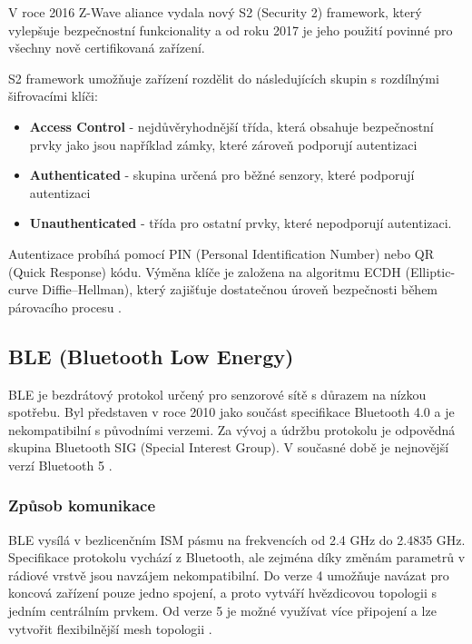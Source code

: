  V roce 2016 Z-Wave aliance vydala nový S2 (Security 2) framework, který vylepšuje bezpečnostní funkcionality 
 a od roku 2017 je jeho použití povinné pro všechny nově certifikovaná zařízení. 
 
 S2 framework umožňuje zařízení rozdělit do následujících skupin s rozdílnými šifrovacími klíči:
 \begin{itemize}
  \item \textbf{Access Control} - 
   nejdůvěryhodnější třída, která obsahuje bezpečnostní prvky jako jsou například zámky,
   které zároveň podporují autentizaci
  \item \textbf{Authenticated} - 
  skupina určená pro běžné senzory, které podporují autentizaci 
  \item \textbf{Unauthenticated} - 
  třída pro ostatní prvky, které nepodporují autentizaci.
 \end{itemize}
 Autentizace probíhá pomocí PIN (Personal Identification Number) nebo QR (Quick Response) kódu.
 Výměna klíče je založena na algoritmu ECDH (Elliptic-curve Diffie–Hellman), který zajišťuje 
 dostatečnou úroveň bezpečnosti během párovacího procesu \cite{cesnet-survey}.

 
  \subsection{BLE (Bluetooth Low Energy)} 
  BLE je bezdrátový protokol určený pro senzorové sítě s důrazem na nízkou spotřebu. Byl představen 
  v roce 2010 jako součást specifikace Bluetooth 4.0 a je nekompatibilní s původními verzemi. 
  Za vývoj a údržbu protokolu je odpovědná skupina Bluetooth SIG (Special Interest Group).
  V současné době je nejnovější verzí Bluetooth 5 \cite{cesnet-survey}.
  
  \subsubsection{Způsob komunikace}
  BLE vysílá v bezlicenčním ISM pásmu na frekvencích od 2.4 GHz do 2.4835 GHz. Specifikace
  protokolu vychází z Bluetooth, ale zejména díky změnám parametrů v rádiové vrstvě 
  jsou navzájem nekompatibilní. Do verze 4 umožňuje navázat pro koncová zařízení pouze jedno spojení,
  a proto 
  vytváří hvězdicovou topologii s jedním centrálním prvkem. Od verze 5 je možné využívat více připojení
  a lze vytvořit flexibilnější mesh topologii \cite{cesnet-survey}. 
  
